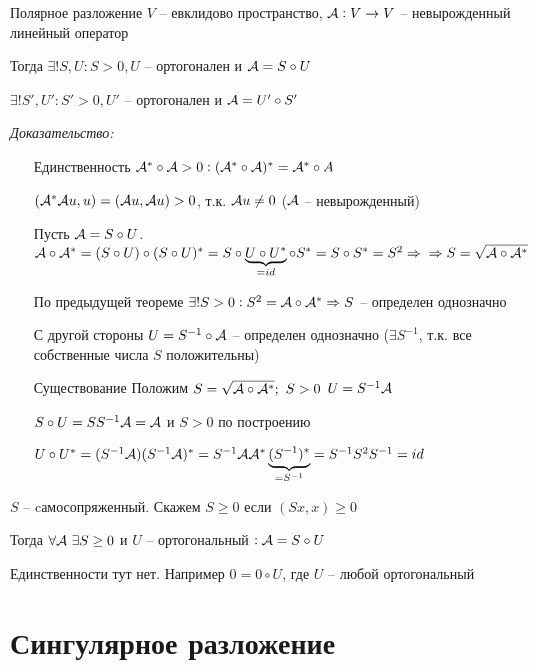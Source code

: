 \documentclass[12pt]{article}
\begin{document}
\begin{theo}{Полярное разложение}
    $V$ -- евклидово пространство, $\mathcal{A} : V \to V$ -- невырожденный линейный оператор 

    Тогда $\exists! S, U : S > 0, U$ -- ортогонален и $\mathcal{A} = S \circ U$

    $\exists! S', U' : S' > 0, U'$ -- ортогонален и $\mathcal{A} = U' \circ S'$
\end{theo}

\textit{Доказательство:}

\begin{itemize}
    \item[Единственность] $\mathcal{A}^* \circ \mathcal{A} > 0 : (\mathcal{A}^* \circ \mathcal{A})^* = \mathcal{A}^* \circ A$
    
    $(\mathcal{A}^* \mathcal{A} u, u) = (\mathcal{A} u, \mathcal{A} u) > 0$, т.к. $\mathcal{A} u \neq 0$ ($\mathcal{A}$ -- невырожденный)
    
    Пусть $\mathcal{A} = S \circ U$. $\mathcal{A} \circ \mathcal{A}^* = (S \circ U) \circ (S \circ U)^* = S \circ \underbrace{U \circ U^*}_{= id} \circ S^* = S \circ S^* = S^2 \Rightarrow \\ \Rightarrow S = \sqrt{\mathcal{A} \circ \mathcal{A}^*}$

    По предыдущей теореме $\exists! S > 0 : S^2 = \mathcal{A} \circ \mathcal{A}^* \Rightarrow S$ -- определен однозначно

    С другой стороны $U = S^{-1} \circ \mathcal{A}$ -- определен однозначно ($\exists S^{-1}$, т.к. все собственные числа $S$ положительны)

    \item[Существование] Положим $S = \sqrt{\mathcal{A} \circ \mathcal{A}^*};\ S > 0$
    $U = S^{-1}\mathcal{A}$

    $S \circ U = SS^{-1}\mathcal{A} = \mathcal{A}$ и $S > 0$ по построению 

    $U \circ U^* = (S^{-1}\mathcal{A})(S^{-1}\mathcal{A})^* = S^{-1} \mathcal{A} \mathcal{A}^* \underbrace{(S^{-1})^*}_{= S^{-1}} = S^{-1} S^2 S^{-1} = id$ 
\end{itemize}

\begin{Remark}{}
    $S$ -- cамосопряженный. Скажем $S \geq 0$ если $(Sx, x) \geq 0$

    Тогда $\forall \mathcal{A}\ \exists S \geq 0$ и $U$ -- ортогональный $: \mathcal{A} = S \circ U$

    Единственности тут нет. Например $0 = 0 \circ U$, где $U$ -- любой ортогональный
\end{Remark}

\section{Сингулярное разложение}
\end{document}
